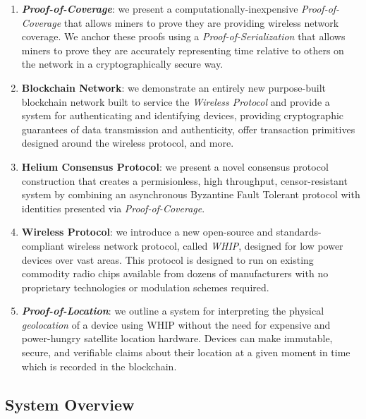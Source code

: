 \documentclass[10pt, nonatbib, nocopyrightspace, reprint]{sigplanconf}
\begin{document}
\begin{enumerate}
  \item \textbf{\emph{Proof-of-Coverage}}: we present a computationally-inexpensive \emph{Proof-of-Coverage} that allows miners to prove they are providing wireless network coverage. We anchor these proofs using a \emph{Proof-of-Serialization} that allows miners to prove they are accurately representing time relative to others on the network in a cryptographically secure way.

  \item \textbf{Blockchain Network}: we demonstrate an entirely new purpose-built blockchain network built to service the \emph{Wireless Protocol} and provide a system for authenticating and identifying devices, providing cryptographic guarantees of data transmission and authenticity, offer transaction primitives designed around the wireless protocol, and more.

  \item \textbf{Helium Consensus Protocol}: we present a novel consensus protocol construction that creates a permisionless, high throughput, censor-resistant system by combining an asynchronous Byzantine Fault Tolerant protocol with identities presented via \emph{Proof-of-Coverage}.

  \item \textbf{Wireless Protocol}: we introduce a new open-source and standards-compliant wireless network protocol, called \emph{WHIP}, designed for low power devices over vast areas. This protocol is designed to run on existing commodity radio chips available from dozens of manufacturers with no proprietary technologies or modulation schemes required.

  \item \textbf{\emph{Proof-of-Location}}: we outline a system for interpreting the physical \emph{geolocation} of a device using WHIP without the need for expensive and power-hungry satellite location hardware. Devices can make immutable, secure, and verifiable claims about their location at a given moment in time which is recorded in the blockchain.
\end{enumerate}

\subsection{System Overview}
\end{document}
